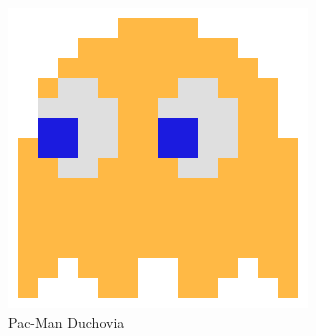 \documentclass[10pt,oneside,slovak,a4paper]{article}
\begin{document}
\begin{figure}[tbh]
	\includegraphics[scale=0.2]{orangeGhost.png}
	\caption{Pac-Man Duchovia}
	\label{obr3}
\end{figure}
\end{document}
